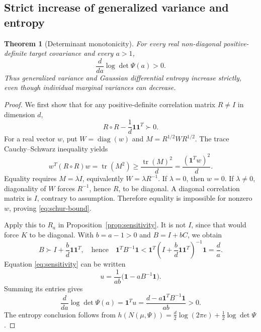 \documentclass[11pt]{article}
\newtheorem{theorem}{Theorem}
\theoremstyle{remark}\newtheorem{remark}[theorem]{Remark}
\DeclareMathOperator{\diag}{diag}
\DeclareMathOperator{\tr}{tr}
\newcommand{\one}{\mathbf 1}
\begin{document}
\subsection{Strict increase of generalized variance and entropy}
\begin{theorem}[Determinant monotonicity]\label{thm:determinant}
For every real non-diagonal positive-definite target covariance and every $a>1$,
\begin{equation}\label{eq:determinant}
\frac{d}{da}\log\det\Psi(a)>0.
\end{equation}
Thus generalized variance and Gaussian differential entropy increase strictly, even though individual marginal variances can decrease.
\end{theorem}
\begin{proof}
We first show that for any positive-definite correlation matrix $R\ne I$ in dimension $d$,
\begin{equation}\label{eq:schur-bound}
R\circ R-\frac1d\one\one^T\succ0.
\end{equation}
For a real vector $w$, put $W=\diag(w)$ and $M=R^{1/2}WR^{1/2}$. The trace Cauchy--Schwarz inequality yields
\[
w^T(R\circ R)w=\tr(M^2)\geq\frac{\tr(M)^2}{d}
=\frac{(\one^Tw)^2}{d}.
\]
Equality requires $M=\lambda I$, equivalently $W=\lambda R^{-1}$. If $\lambda=0$, then $w=0$. If $\lambda\ne0$, diagonality of $W$ forces $R^{-1}$, hence $R$, to be diagonal. A diagonal correlation matrix is $I$, contrary to assumption. Therefore equality is impossible for nonzero $w$, proving \eqref{eq:schur-bound}.

Apply this to $R_a$ in Proposition~\ref{prop:sensitivity}. It is not $I$, since that would force $K$ to be diagonal. With $b=a-1>0$ and $B=I+bC$, we obtain
\[
B\succ I+\frac b d\one\one^T,
\quad\text{hence}\quad
\one^TB^{-1}\one<
\one^T\left(I+\frac b d\one\one^T\right)^{-1}\one=\frac d a.
\]
Equation \eqref{eq:sensitivity} can be written
\[
u=\frac{1}{ab}\bigl(\one-aB^{-1}\one\bigr).
\]
Summing its entries gives
\[
\frac{d}{da}\log\det\Psi(a)=\one^Tu
=\frac{d-a\one^TB^{-1}\one}{ab}>0.
\]
The entropy conclusion follows from
$h(N(\mu,\Psi))=\frac d2\log(2\pi e)+\frac12\log\det\Psi$.
\end{proof}
\end{document}
